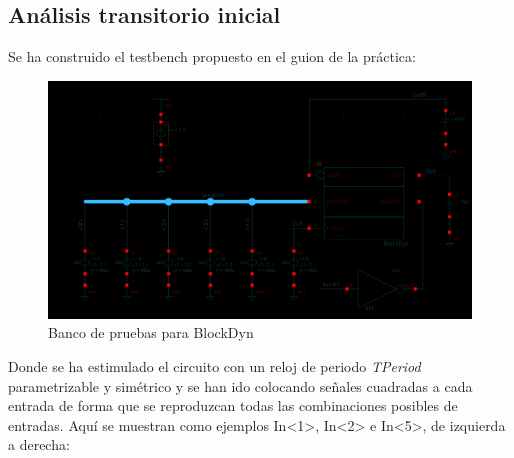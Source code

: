 \subsection{Análisis transitorio inicial}
Se ha construido el testbench propuesto en el guion de la práctica:
\begin{figure}[h]%
\begin{flushleft}
\includegraphics[width=1.1\textwidth]{figures/BlockDynTBSchem.PNG}
\caption{Banco de pruebas para BlockDyn}
\label{fig:BlockDynTBSchem}
\end{flushleft}
\end{figure} \newline
Donde se ha estimulado el circuito con un reloj de periodo \textit{TPeriod} parametrizable y simétrico y se han ido colocando señales cuadradas a cada entrada de forma que se reproduzcan todas las combinaciones posibles de entradas. 
\newpage Aquí se muestran como ejemplos In<1>, In<2>  e In<5>, de izquierda a derecha:
